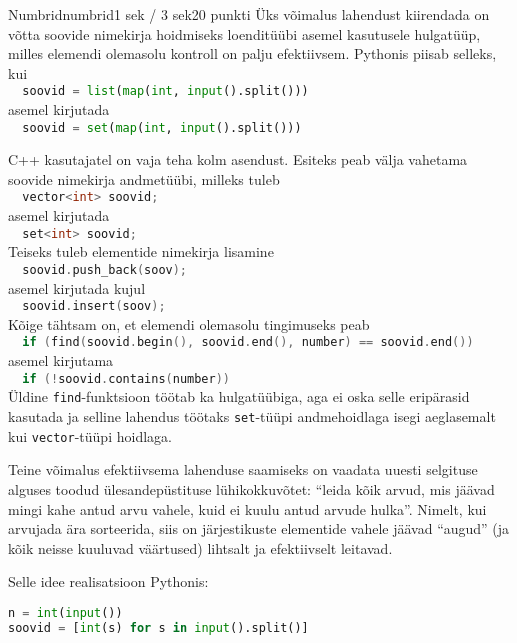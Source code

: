 \begin{yl}{2}{Numbrid}{numbrid}{1 sek / 3 sek}{20 punkti}
Üks võimalus lahendust kiirendada on võtta soovide nimekirja hoidmiseks loenditüübi asemel kasutusele hulgatüüp, milles elemendi olemasolu kontroll on palju efektiivsem. Pythonis piisab selleks, kui \\
\lstinline[language=Python]|  soovid = list(map(int, input().split()))| \\
asemel kirjutada \\
\lstinline[language=Python]|  soovid = set(map(int, input().split()))|

C++ kasutajatel on vaja teha kolm asendust. Esiteks peab välja vahetama soovide nimekirja andmetüübi, milleks tuleb \\
\lstinline[language=C++]|  vector<int> soovid;| \\
asemel kirjutada \\
\lstinline[language=C++]|  set<int> soovid;| \\
Teiseks tuleb elementide nimekirja lisamine \\
\lstinline[language=C++]|  soovid.push_back(soov);| \\
asemel kirjutada kujul \\
\lstinline[language=C++]|  soovid.insert(soov);| \\
Kõige tähtsam on, et elemendi olemasolu tingimuseks peab \\
\lstinline[language=C++]|  if (find(soovid.begin(), soovid.end(), number) == soovid.end())| \\
asemel kirjutama \\
\lstinline[language=C++]|  if (!soovid.contains(number))| \\
Üldine \lstinline[language=C++]|find|-funktsioon töötab ka hulgatüübiga, aga ei oska selle eripärasid kasutada ja selline lahendus töötaks \lstinline[language=C++]|set|-tüüpi andmehoidlaga isegi aeglasemalt kui \lstinline[language=C++]|vector|-tüüpi hoidlaga.

Teine võimalus efektiivsema lahenduse saamiseks on vaadata uuesti selgituse alguses toodud ülesandepüstituse lühikokkuvõtet: ``leida kõik arvud, mis jäävad mingi kahe antud arvu vahele, kuid ei kuulu antud arvude hulka''. Nimelt, kui arvujada ära sorteerida, siis on järjestikuste elementide vahele jäävad ``augud'' (ja kõik neisse kuuluvad väärtused) lihtsalt ja efektiivselt leitavad.

Selle idee realisatsioon Pythonis:
\begin{lstlisting}[language=Python]
n = int(input())
soovid = [int(s) for s in input().split()]


\end{lstlisting}
\end{yl}
